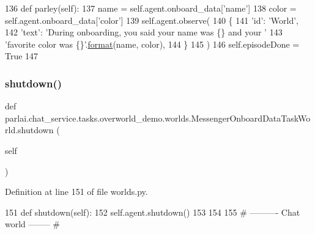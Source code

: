 \begin{DoxyCode}
136     \textcolor{keyword}{def }parley(self):
137         name = self.agent.onboard\_data[\textcolor{stringliteral}{'name'}]
138         color = self.agent.onboard\_data[\textcolor{stringliteral}{'color'}]
139         self.agent.observe(
140             \{
141                 \textcolor{stringliteral}{'id'}: \textcolor{stringliteral}{'World'},
142                 \textcolor{stringliteral}{'text'}: \textcolor{stringliteral}{'During onboarding, you said your name was \{\} and your '}
143                 \textcolor{stringliteral}{'favorite color was \{\}'}.\hyperlink{namespaceparlai_1_1chat__service_1_1services_1_1messenger_1_1shared__utils_a32e2e2022b824fbaf80c747160b52a76}{format}(name, color),
144             \}
145         )
146         self.episodeDone = \textcolor{keyword}{True}
147 
\end{DoxyCode}
\mbox{\label{classparlai_1_1chat__service_1_1tasks_1_1overworld__demo_1_1worlds_1_1MessengerOnboardDataTaskWorld_a342a734f7dfe3a9353004ef78b4f5478}} 
\subsubsection{\texorpdfstring{shutdown()}{shutdown()}}
{\footnotesize\ttfamily def parlai.\+chat\+\_\+service.\+tasks.\+overworld\+\_\+demo.\+worlds.\+Messenger\+Onboard\+Data\+Task\+World.\+shutdown (\begin{DoxyParamCaption}\item[{}]{self }\end{DoxyParamCaption})}



Definition at line 151 of file worlds.\+py.


\begin{DoxyCode}
151     \textcolor{keyword}{def }shutdown(self):
152         self.agent.shutdown()
153 
154 
155 \textcolor{comment}{# ---------- Chat world -------- #}
\end{DoxyCode}


